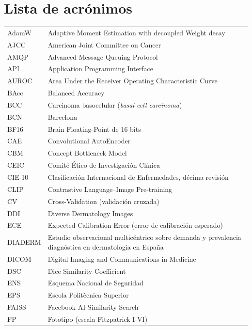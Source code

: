 
\chapter*{Lista de acrónimos}

\begin{longtable}{p{}p{}}
AdamW & Adaptive Moment Estimation with decoupled Weight decay \\
AJCC & American Joint Committee on Cancer \\
AMQP & Advanced Message Queuing Protocol \\
API & Application Programming Interface \\
AUROC & Area Under the Receiver Operating Characteristic Curve \\
BAcc & Balanced Accuracy \\
BCC & Carcinoma basocelular (\emph{basal cell carcinoma}) \\
BCN & Barcelona \\
BF16 & Brain Floating-Point de 16 bits \\
CAE & Convolutional AutoEncoder \\
CBM & Concept Bottleneck Model \\
CEIC & Comité Ético de Investigación Clínica \\
CIE-10 & Clasificación Internacional de Enfermedades, décima revisión \\
CLIP & Contrastive Language--Image Pre-training \\
CV & Cross-Validation (validación cruzada) \\
DDI & Diverse Dermatology Images \\
ECE & Expected Calibration Error (error de calibración esperado) \\
DIADERM & Estudio observacional multicéntrico sobre demanda y prevalencia diagnóstica en dermatología en España \\
DICOM & Digital Imaging and Communications in Medicine \\
DSC & Dice Similarity Coefficient \\
ENS & Esquema Nacional de Seguridad \\
EPS & Escola Politècnica Superior \\
FAISS & Facebook AI Similarity Search \\
FP & Fototipo (escala Fitzpatrick I-VI) \\

\end{longtable}
